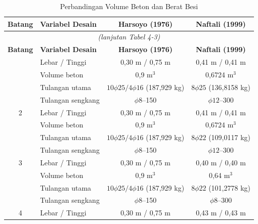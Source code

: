 \begin{landscape}
\begingroup
\footnotesize
\begin{longtable}{clcccc}
\caption{Perbandingan Volume Beton dan Berat Besi}
\label{tab:4-3}\\
\toprule
\textbf{Batang} & \textbf{Variabel Desain} & \multicolumn{2}{c}{\textbf{Harsoyo (1976)}} & \multicolumn{2}{c}{\textbf{Naftali (1999)}} \\
\midrule
\endfirsthead
\multicolumn{6}{c}{\textit{(lanjutan Tabel 4-3)}}\\
\toprule
\textbf{Batang} & \textbf{Variabel Desain} & \multicolumn{2}{c}{\textbf{Harsoyo (1976)}} & \multicolumn{2}{c}{\textbf{Naftali (1999)}} \\
\midrule
\endhead
\bottomrule
\endfoot
\bottomrule
\endlastfoot
1 & Lebar / Tinggi & \multicolumn{2}{c}{0,30 m / 0,75 m} & \multicolumn{2}{c}{0,41 m / 0,41 m} \\
  & Volume beton & \multicolumn{2}{c}{0,9 m$^3$} & \multicolumn{2}{c}{0,6724 m$^3$} \\
  & Tulangan utama & \multicolumn{2}{c}{$10\phi25/4\phi16$ (187,929 kg)} & \multicolumn{2}{c}{$8\phi25$ (136,8158 kg)} \\
  & Tulangan sengkang & \multicolumn{2}{c}{$\phi8$--150} & \multicolumn{2}{c}{$\phi12$--300} \\
2 & Lebar / Tinggi & \multicolumn{2}{c}{0,30 m / 0,75 m} & \multicolumn{2}{c}{0,41 m / 0,41 m} \\
  & Volume beton & \multicolumn{2}{c}{0,9 m$^3$} & \multicolumn{2}{c}{0,6724 m$^3$} \\
  & Tulangan utama & \multicolumn{2}{c}{$10\phi25/4\phi16$ (187,929 kg)} & \multicolumn{2}{c}{$8\phi22$ (109,0117 kg)} \\
  & Tulangan sengkang & \multicolumn{2}{c}{$\phi8$--150} & \multicolumn{2}{c}{$\phi12$--300} \\
3 & Lebar / Tinggi & \multicolumn{2}{c}{0,30 m / 0,75 m} & \multicolumn{2}{c}{0,40 m / 0,40 m} \\
  & Volume beton & \multicolumn{2}{c}{0,9 m$^3$} & \multicolumn{2}{c}{0,64 m$^3$} \\
  & Tulangan utama & \multicolumn{2}{c}{$10\phi25/4\phi16$ (187,929 kg)} & \multicolumn{2}{c}{$8\phi22$ (101,2778 kg)} \\
  & Tulangan sengkang & \multicolumn{2}{c}{$\phi8$--150} & \multicolumn{2}{c}{$\phi8$--300} \\
4 & Lebar / Tinggi & \multicolumn{2}{c}{0,30 m / 0,75 m} & \multicolumn{2}{c}{0,43 m / 0,43 m} \\

\end{longtable}
\end{landscape}
